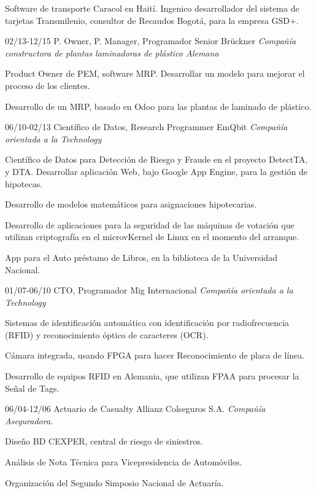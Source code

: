 \begin{entrylist}
{%

Software de transporte Caracol en Haití. Ingenico desarrollador del sistema de tarjetas Transmilenio,
consultor de Recaudos Bogotá, para la empresa GSD+.}
  \entry
	{02/13-12/15}
	{P. Owner, P. Manager, Programador Senior}
	{Brückner {\sl Compañía constructora de plantas laminadoras de plástico Alemana}}
	{Product Owner de PEM, software MRP. Desarrollar un modelo para mejorar el proceso de los clientes.

	Desarrollo de un MRP, basado en Odoo para las plantas de laminado de plástico.}

\end{entrylist}
\newpage
%

\begin{entrylist}


  \entry
	{06/10-02/13}
	{Científico de Datos, Research Programmer}
	{EmQbit {\sl Compañía orientada a la Technology}}
	{Científico de Datos para Detección de Riesgo y Fraude en el proyecto DetectTA, y DTA.
Desarrollar aplicación Web, bajo Google App Engine, para la gestión de hipotecas.

Desarrollo de modelos matemáticos para asignaciones hipotecarias.

Desarrollo de aplicaciones para la seguridad de las máquinas de votación que utilizan criptografía
en el microvKernel de Linux en el momento del arranque.

App para el Auto préstamo de Libros, en la biblioteca de la Universidad Nacional.}

  \entry
	{01/07-06/10}
	{CTO, Programador}
	{Mig Internacional {\sl Compañía orientada a la Technology}}
	{Sistemas de identificación automática con identificación por radiofrecuencia (RFID)
y reconocimiento óptico de caracteres (OCR).

Cámara integrada, usando FPGA para hacer Reconocimiento de placa de línea.

Desarrollo de equipos RFID en Alemania, que utilizan FPAA para procesar la
Señal de Tags.}

  \entry
	{06/04-12/06}
	{Actuario de Casualty}
	{Allianz Colseguros S.A. {\sl Compañía Aseguradora.}}
	{Diseño BD CEXPER, central de riesgo de siniestros.

Análisis de Nota Técnica para Vicepresidencia de Automóviles.

Organización del Segundo Simposio Nacional de Actuaría.

}
\end{entrylist}

